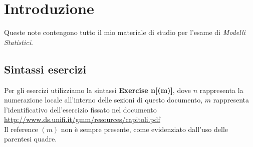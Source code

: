 \section*{Introduzione}
Queste note contengono tutto il mio materiale di studio per l'esame di
\emph{Modelli Statistici}.

\subsection*{Sintassi esercizi}
Per gli esercizi utilizziamo la sintassi \textbf{Exercise n[(m)]},
dove $n$ rappresenta la numerazione locale all'interno delle sezioni
di questo documento, $m$ rappresenta l'identificativo dell'esercizio
fissato nel documento \\
\href{http://www.ds.unifi.it/gmm/resources/capitoli.pdf}{
  http://www.ds.unifi.it/gmm/resources/capitoli.pdf}\\
Il reference $(m)$ non \`e sempre presente, come evidenziato dall'uso
delle parentesi quadre.

